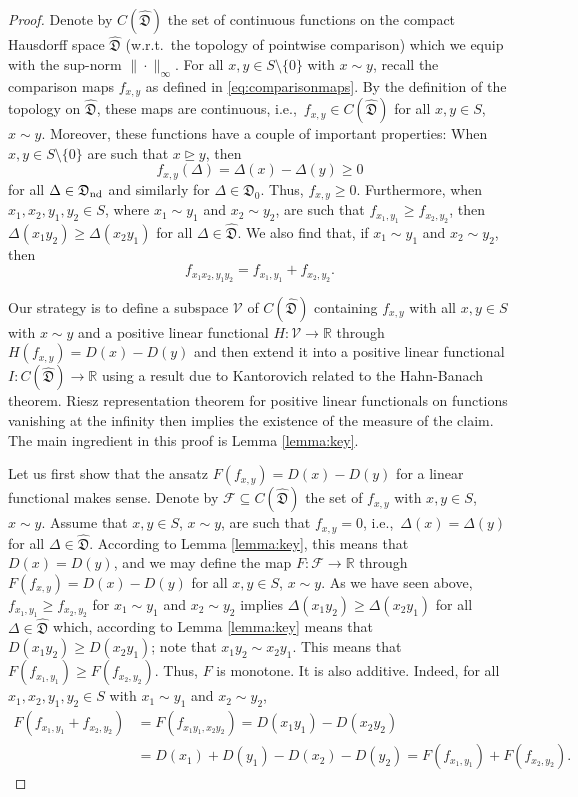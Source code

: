 \documentclass[12pt,a4paper,reqno]{amsart}
\newcommand{\rgeq}{\trianglerighteq}
\theoremstyle{definition}
\newcommand{\mc}[1]{\mathcal{#1}}
\newcommand{\mf}[1]{\mathfrak{#1}}
\newcommand{\R}{\mathbb R}
\begin{document}
\begin{proof}
Denote by $C(\hat{\mf D})$ the set of continuous functions on the compact Hausdorff space $\hat{\mf D}$ (w.r.t.\ the topology of pointwise comparison) which we equip with the sup-norm $\|\cdot\|_\infty$. For all $x,y\in S\setminus\{0\}$ with $x\sim y$, recall the comparison maps $f_{x,y}$ as defined in \eqref{eq:comparisonmaps}. By the definition of the topology on $\hat{\mf D}$, these maps are continuous, i.e.,\ $f_{x,y}\in C(\hat{\mf D})$ for all $x,y\in S$, $x\sim y$. Moreover, these functions have a couple of important properties: When $x,y\in S\setminus\{0\}$ are such that $x\rgeq y$, then
$$
f_{x,y}(\Delta)=\Delta(x)-\Delta(y)\geq0
$$
for all $\Delta\in\mf D_{\rm nd}$ and similarly for $\Delta\in\mf D_0$. Thus, $f_{x,y}\geq0$. Furthermore, when $x_1,x_2,y_1,y_2\in S$, where $x_1\sim y_1$ and $x_2\sim y_2$, are such that $f_{x_1,y_1}\geq f_{x_2,y_2}$, then $\Delta(x_1y_2)\geq\Delta(x_2y_1)$ for all $\Delta\in\hat{\mf D}$. We also find that, if $x_1\sim y_1$ and $x_2\sim y_2$, then
$$
f_{x_1x_2,y_1y_2}=f_{x_1,y_1}+f_{x_2,y_2}.
$$

Our strategy is to define a subspace $\mc V$ of $C(\hat{\mf D})$ containing $f_{x,y}$ with all $x,y\in S$ with $x\sim y$ and a positive linear functional $H:\mc V\to\R$ through $H(f_{x,y})=D(x)-D(y)$ and then extend it into a positive linear functional $I:C(\hat{\mf D})\to\R$ using a result due to Kantorovich related to the Hahn-Banach theorem. Riesz representation theorem for positive linear functionals on functions vanishing at the infinity then implies the existence of the measure of the claim. The main ingredient in this proof is Lemma \ref{lemma:key}.

Let us first show that the ansatz $F(f_{x,y})=D(x)-D(y)$ for a linear functional makes sense. Denote by $\mc F\subseteq C(\hat{\mf D})$ the set of $f_{x,y}$ with $x,y\in S$, $x\sim y$. Assume that $x,y\in S$, $x\sim y$, are such that $f_{x,y}=0$, i.e.,\ $\Delta(x)=\Delta(y)$ for all $\Delta\in\hat{\mf D}$. According to Lemma \ref{lemma:key}, this means that $D(x)=D(y)$, and we may define the map $F:\mc F\to\R$ through $F(f_{x,y})=D(x)-D(y)$ for all $x,y\in S$, $x\sim y$. As we have seen above, $f_{x_1,y_1}\geq f_{x_2,y_2}$ for $x_1\sim y_1$ and $x_2\sim y_2$ implies $\Delta(x_1y_2)\geq\Delta(x_2y_1)$ for all $\Delta\in\hat{\mf D}$ which, according to Lemma \ref{lemma:key} means that $D(x_1y_2)\geq D(x_2y_1)$; note that $x_1y_2\sim x_2y_1$. This means that $F(f_{x_1,y_1})\geq F(f_{x_2,y_2})$. Thus, $F$ is monotone. It is also additive. Indeed, for all $x_1,x_2,y_1,y_2\in S$ with $x_1\sim y_1$ and $x_2\sim y_2$,
\begin{align*}
F(f_{x_1,y_1}+f_{x_2,y_2})&=F(f_{x_1y_1,x_2y_2})=D(x_1y_1)-D(x_2y_2)\\
&=D(x_1)+D(y_1)-D(x_2)-D(y_2)=F(f_{x_1,y_1})+F(f_{x_2,y_2}).
\end{align*}


\end{proof}
\end{document}

